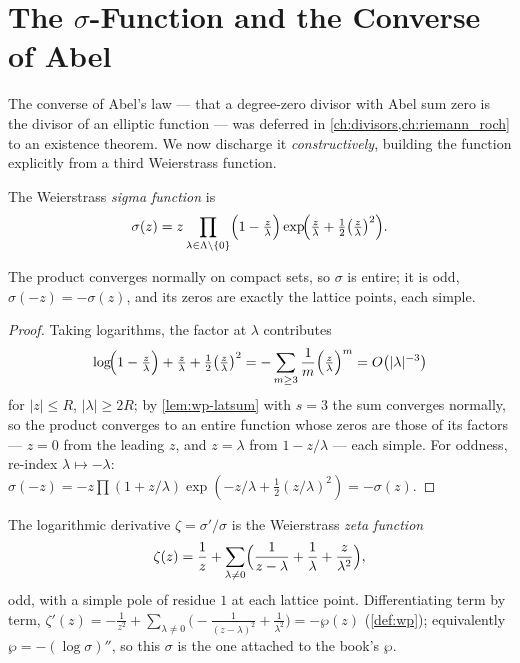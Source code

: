 \section{The \texorpdfstring{$\sigma$}{sigma}-Function and the Converse of Abel}
\label{sec:wp-sigma}

The converse of Abel's law --- that a degree-zero divisor with Abel sum zero is the
divisor of an elliptic function --- was deferred in
\cref{ch:divisors,ch:riemann_roch} to an existence theorem. We now discharge it
\emph{constructively}, building the function explicitly from a third Weierstrass
function.

\begin{definition}
\label{def:wp-sigma}
The Weierstrass \emph{sigma function} is
\[
  \sigma(z) = z \prod_{\lambda \in \Lambda\setminus\{0\}}
  \Bigl(1 - \tfrac{z}{\lambda}\Bigr)
  \exp\!\Bigl(\tfrac{z}{\lambda} + \tfrac12\bigl(\tfrac{z}{\lambda}\bigr)^2\Bigr).
\]
\end{definition}

\begin{proposition}
\label{prop:wp-sigma}
The product converges normally on compact sets, so \(\sigma\) is entire; it is odd,
\(\sigma(-z) = -\sigma(z)\), and its zeros are exactly the lattice points, each
simple.
\end{proposition}

\begin{proof}
Taking logarithms, the factor at \(\lambda\) contributes
\[
  \log\!\Bigl(1 - \tfrac{z}{\lambda}\Bigr) + \tfrac{z}{\lambda}
  + \tfrac12\bigl(\tfrac{z}{\lambda}\bigr)^2
  = -\sum_{m\ge3}\frac1m\Bigl(\tfrac{z}{\lambda}\Bigr)^m
  = O\bigl(|\lambda|^{-3}\bigr)
\]
for \(|z|\le R\), \(|\lambda|\ge 2R\); by \cref{lem:wp-latsum} with \(s = 3\) the
sum converges normally, so the product converges to an entire function whose zeros
are those of
its factors --- \(z = 0\) from the leading \(z\), and \(z = \lambda\) from
\(1 - z/\lambda\) --- each simple. For oddness, re-index \(\lambda \mapsto -\lambda\):
\(\sigma(-z) = -z\prod(1 + z/\lambda)\exp(-z/\lambda + \tfrac12(z/\lambda)^2)
= -\sigma(z)\).
\end{proof}

The logarithmic derivative \(\zeta = \sigma'/\sigma\) is the Weierstrass
\emph{zeta function}
\[
  \zeta(z) = \frac1z + \sum_{\lambda\neq0}
  \Bigl(\frac{1}{z-\lambda} + \frac1\lambda + \frac{z}{\lambda^2}\Bigr),
\]
odd, with a simple pole of residue \(1\) at each lattice point. Differentiating
term by term, \(\zeta'(z) = -\tfrac1{z^2} + \sum_{\lambda\neq0}\bigl(-\tfrac1{(z-\lambda)^2}
+ \tfrac1{\lambda^2}\bigr) = -\wp(z)\) (\cref{def:wp}); equivalently
\(\wp = -(\log\sigma)''\), so this \(\sigma\) is the one attached to the book's
\(\wp\).

